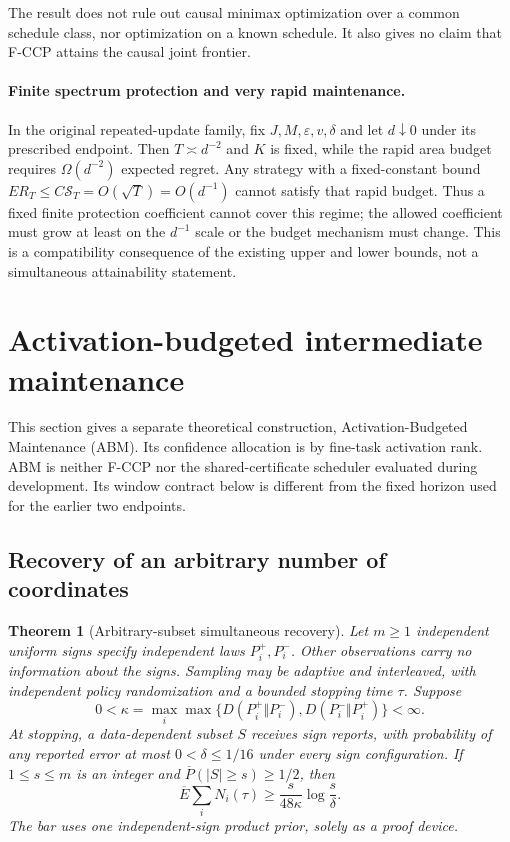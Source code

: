 \documentclass[11pt]{article}
\newtheorem{theorem}{Theorem}[section]
\theoremstyle{remark}
\begin{document}
The result does not rule out causal minimax optimization over a common
schedule class, nor optimization on a known schedule. It also gives no
claim that F-CCP attains the causal joint frontier.

\paragraph{Finite spectrum protection and very rapid maintenance.}
In the original repeated-update family, fix $J,M,\varepsilon,v,\delta$
and let $d\downarrow0$ under its prescribed endpoint. Then
$T\asymp d^{-2}$ and $K$ is fixed, while the rapid area budget requires
$\Omega(d^{-2})$ expected regret. Any strategy with a fixed-constant
bound $ER_T\le C\mathcal S_T=O(\sqrt T)=O(d^{-1})$ cannot satisfy that
rapid budget. Thus a fixed finite protection coefficient cannot cover
this regime; the allowed coefficient must grow at least on the
$d^{-1}$ scale or the budget mechanism must change. This is a
compatibility consequence of the existing upper and lower bounds,
not a simultaneous attainability statement.

\section{Activation-budgeted intermediate maintenance}
\label{app:abm}

This section gives a separate theoretical construction,
Activation-Budgeted Maintenance (ABM). Its confidence allocation is by
fine-task activation rank. ABM is neither F-CCP nor the shared-certificate
scheduler evaluated during development. Its window contract below is
different from the fixed horizon used for the earlier two endpoints.

\subsection{Recovery of an arbitrary number of coordinates}

\begin{theorem}[Arbitrary-subset simultaneous recovery]
\label{thm:any-subset-recovery}
Let $m\ge1$ independent uniform signs specify independent laws
$P_i^+,P_i^-$. Other observations carry no information about the signs.
Sampling may be adaptive and interleaved, with independent policy
randomization and a bounded stopping time $\tau$. Suppose
\[
 0<\kappa=\max_i\max\{D(P_i^+\Vert P_i^-),
                           D(P_i^-\Vert P_i^+)\}<\infty.
\]
At stopping, a data-dependent subset $S$ receives sign reports, with
probability of any reported error at most $0<\delta\le1/16$ under every
sign configuration. If $1\le s\le m$ is an integer and
$\overline P(|S|\ge s)\ge1/2$, then
\[
 \overline E\sum_iN_i(\tau)\ge
                \frac{s}{48\kappa}\log\frac{s}{\delta}.
\]
The bar uses one independent-sign product prior, solely as a proof device.
\end{theorem}
\end{document}
